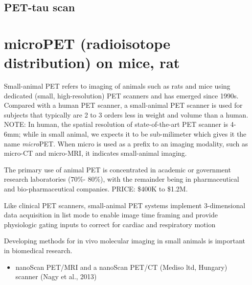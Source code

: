 \subsection{PET-tau scan}
\label{sec:PET-tau-scan}



\section{microPET (radioisotope distribution) on mice, rat}
\label{sec:microPET}

Small-animal PET refers to imaging of animals such as rats and mice using
dedicated (small, high-resolution) PET scanners and has emerged since 1990s.
Compared with a human PET scanner, a small-animal PET scanner is used for
subjects that typically are 2 to 3 orders less in weight and volume than a
human. NOTE: In human, the spatial resolution of state-of-the-art PET scanner is
4-6mm; while in small animal, we expects it to be sub-milimeter which gives it
the name {\it micro}PET.
When micro is used as a prefix to an imaging modality, such as micro-CT and
micro-MRI, it indicates small-animal imaging.

\begin{mdframed}
The primary use of animal PET is concentrated in
academic  or  government  research  laboratories  (70\%-
80\%), with the remainder being in pharmaceutical and bio-pharmaceutical
companies. PRICE: \$400K to \$1.2M.

Like clinical PET scanners, small-animal PET systems implement 3-dimensional
data acquisition in list mode to enable image time framing and provide
physiologic gating inputs to correct for cardiac and respiratory motion
\end{mdframed}

Developing methods for in vivo molecular imaging in small animals is important
in biomedical research.
\begin{itemize}
  \item  nanoScan PET/MRI and a nanoScan PET/CT (Mediso ltd, Hungary) scanner
  (Nagy et al., 2013)

  
\end{itemize}

